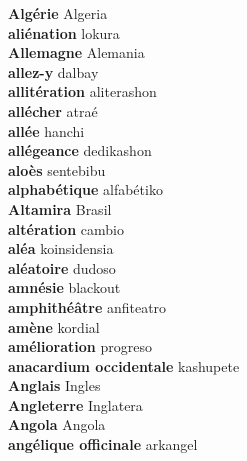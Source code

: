 \textbf{ Algérie  } Algeria \\
\textbf{ aliénation  } lokura \\
\textbf{ Allemagne  } Alemania \\
\textbf{ allez-y  } dalbay \\
\textbf{ allitération  } aliterashon \\
\textbf{ allécher  } atraé \\
\textbf{ allée  } hanchi \\
\textbf{ allégeance  } dedikashon \\
\textbf{ aloès  } sentebibu \\
\textbf{ alphabétique  } alfabétiko \\
\textbf{ Altamira  } Brasil \\
\textbf{ altération  } cambio \\
\textbf{ aléa  } koinsidensia \\
\textbf{ aléatoire  } dudoso \\
\textbf{ amnésie  } blackout \\
\textbf{ amphithéâtre  } anfiteatro \\
\textbf{ amène  } kordial \\
\textbf{ amélioration  } progreso \\
\textbf{ anacardium occidentale  } kashupete \\
\textbf{ Anglais  } Ingles \\
\textbf{ Angleterre  } Inglatera \\
\textbf{ Angola  } Angola \\
\textbf{ angélique officinale  } arkangel \\
